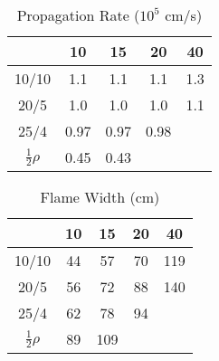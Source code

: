 
\begin{table}

  \caption{Propagation Rate ($10^5$ cm/s)}
  
  \begin{center}
    \begin{tabular}{c||c|c|c|c}
      
      & 10 & 15 & 20 & 40 \\
      \hline\hline
      10/10 & 1.1 & 1.1 & 1.1 & 1.3 \\
      \hline
      20/5 & 1.0 & 1.0 & 1.0 & 1.1 \\
      \hline
      25/4 & 0.97 & 0.97 & 0.98 & \\
      \hline
      $\frac{1}{2}\rho$ & 0.45 & 0.43 & & \\
      
    \end{tabular}
  \end{center}
  
\end{table}

\begin{table}
  
  \caption{Flame Width (cm)}
  
  \begin{center}
    \begin{tabular}{c||c|c|c|c}
      
      & 10 & 15 & 20 & 40 \\
      \hline\hline
      10/10 & 44 & 57 & 70 & 119 \\
      \hline
      20/5 & 56 & 72 & 88 & 140 \\
      \hline
      25/4 & 62 & 78 & 94 & \\
      \hline
      $\frac{1}{2}\rho$ & 89 & 109 & & \\
      
    \end{tabular}
  \end{center}
  
\end{table}
